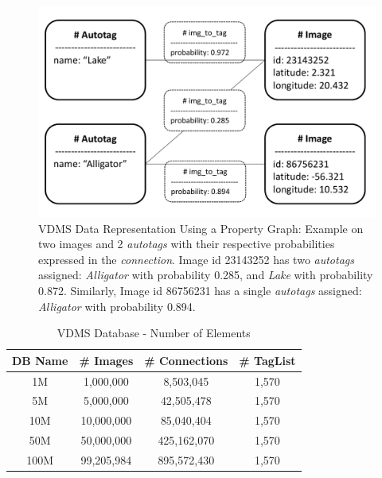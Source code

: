 \begin{figure}[ht]
\centering
\includegraphics[width=\columnwidth]{figures/graph_representation}
\caption{VDMS Data Representation Using a Property Graph:
Example on two images and 2 \textit{autotags} with
their respective probabilities expressed in the \textit{connection}.
Image id 23143252 has two \textit{autotags} assigned:
\textit{Alligator} with probability 0.285, and \textit{Lake} with probability 0.872.
Similarly, Image id 86756231 has a single \textit{autotags} assigned:
\textit{Alligator} with probability 0.894.}
\label{fig:graph_representation}
\end{figure}

\begin{table}[ht]
\caption{VDMS Database - Number of Elements}
\centering
\begin{tabular}{c c c c}
\hline\hline
DB Name & \# Images & \# Connections & \# TagList\\
\hline
1M   & 1,000,000   & 8,503,045    & 1,570\\
5M   & 5,000,000   & 42,505,478   & 1,570\\
10M  & 10,000,000  & 85,040,404   & 1,570\\
50M  & 50,000,000  & 425,162,070  & 1,570\\
100M & 99,205,984  & 895,572,430  & 1,570\\
\hline
\end{tabular}
\label{table:vdmsnodes}
\end{table}

